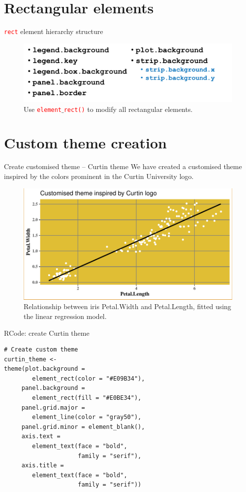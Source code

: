 \documentclass{beamer}
\begin{document}
\section{Rectangular elements}
\begin{frame}{\texttt{\textcolor{red}{rect}} element hierarchy structure}
\begin{figure}
\includegraphics[width=0.99\linewidth]{PlotsLec3/RectThemeElements}
\caption{\small{Use \texttt{\textcolor{red}{element}$\_$\textcolor{red}{rect()}} to modify all rectangular elements}.}
\end{figure}
\end{frame}

\section{Custom theme creation}

\begin{frame}{Create customised theme -- Curtin theme}
We have created a customised theme inspired by the colors prominent in the Curtin University logo.
\begin{figure}
\includegraphics[width=0.99\linewidth]{PlotsLec3/CurtinThemePlt}
\caption{\small{Relationship between iris Petal.Width and Petal.Length, fitted using the linear regression model.}}
\end{figure}
\end{frame}

\begin{frame}[fragile]{RCode: create Curtin theme}
\begin{lstlisting}
# Create custom theme
curtin_theme <-
theme(plot.background = 
      	element_rect(color = "#E09B34"),
     panel.background = 
      	element_rect(fill = "#E0BE34"),
     panel.grid.major = 
      	element_line(color = "gray50"),
     panel.grid.minor = element_blank(),
     axis.text = 
        element_text(face = "bold",
                     family = "serif"),
     axis.title = 
        element_text(face = "bold",
                     family = "serif"))
\end{lstlisting}
\end{frame}
\end{document}
